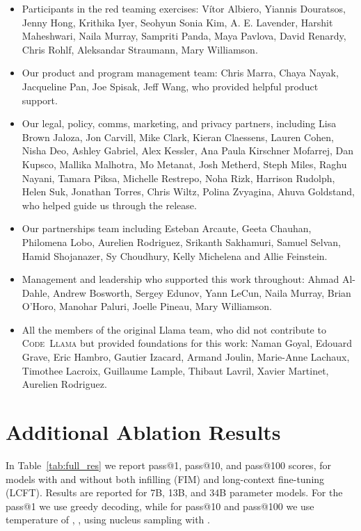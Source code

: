 \documentclass[10pt]{article}
\newcommand{\model}{\textsc{Code~Llama}\xspace}
\begin{document}
\begin{itemize}
    \item Participants in the red teaming exercises: Vítor Albiero, Yiannis Douratsos, Jenny Hong, Krithika Iyer, Seohyun Sonia Kim, A. E. Lavender, Harshit Maheshwari, Naila Murray, Sampriti Panda, Maya Pavlova, David Renardy, Chris Rohlf, Aleksandar Straumann, Mary Williamson.
    \item Our product and program management team: Chris Marra, Chaya Nayak, Jacqueline Pan, Joe Spisak, Jeff Wang, who provided helpful product support.
    \item Our legal, policy, comms, marketing, and privacy partners, including Lisa Brown Jaloza, Jon Carvill, Mike Clark, Kieran Claessens, Lauren Cohen, Nisha Deo, Ashley Gabriel, Alex Kessler, Ana Paula Kirschner Mofarrej, Dan Kupsco, Mallika Malhotra, Mo Metanat, Josh Metherd, Steph Miles, Raghu Nayani, Tamara Piksa, Michelle Restrepo, Noha Rizk, Harrison Rudolph, Helen Suk, Jonathan Torres, Chris Wiltz, Polina Zvyagina, Ahuva Goldstand, who helped guide us through the release. 
    \item Our partnerships team including Esteban Arcaute, Geeta Chauhan, Philomena Lobo, Aurelien Rodriguez, Srikanth Sakhamuri, Samuel Selvan, Hamid Shojanazer, Sy Choudhury, Kelly Michelena and Allie Feinstein.
    \item Management and leadership who supported this work throughout: Ahmad Al-Dahle, Andrew Bosworth, Sergey Edunov, Yann LeCun, Naila Murray, Brian O'Horo, Manohar Paluri, Joelle Pineau, Mary Williamson.
    \item All the members of the original Llama team, who did not contribute to \model but provided foundations for this work: Naman Goyal, Edouard Grave, Eric Hambro, Gautier Izacard, Armand Joulin, Marie-Anne Lachaux, Timothee Lacroix, Guillaume Lample, Thibaut Lavril, Xavier Martinet, Aurelien Rodriguez.
\end{itemize}

\newpage \section{Additional Ablation Results}
\label{sec:more_abb}

In Table~\ref{tab:full_res} we report pass@1, pass@10, and pass@100 scores, for models with and without both infilling (FIM) and long-context fine-tuning (LCFT). Results are reported for 7B, 13B, and 34B parameter models. For the pass@1 we use greedy decoding, while for pass@10 and pass@100 we use temperature of , , using nucleus sampling with . 
\end{document}
